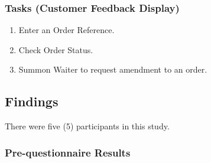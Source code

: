 \documentclass[11pt, a4paper]{report}
\begin{document}
\subsubsection{Tasks (Customer Feedback Display)} 

\begin{enumerate} 
\item Enter an Order Reference.
\item Check Order Status.
\item Summon Waiter to request amendment to an order.
\end{enumerate} 


\subsection{Findings} 
There were five (5) participants in this study.


\subsubsection{Pre-questionnaire Results} 
\end{document}

